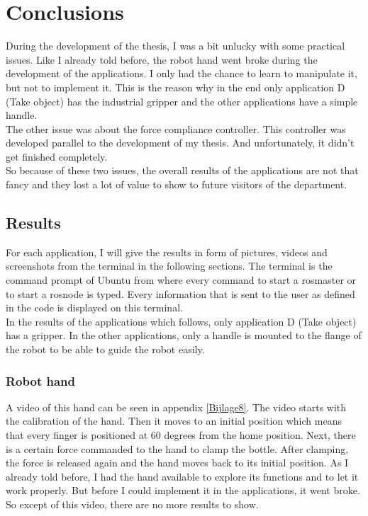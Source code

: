 \documentclass[11pt,a4paper]{report}
\begin{document}
\chapter{Conclusions}
During the development of the thesis, I was a bit unlucky with some practical issues. Like I already told before, the robot hand went broke during the development of the applications. I only had the chance to learn to manipulate it, but not to implement it. This is the reason why in the end only application D (Take object) has the industrial gripper and the other applications have a simple handle.\\
The other issue was about the force compliance controller. This controller was developed parallel to the development of my thesis. And unfortunately, it didn't get finished completely. \\
So because of these two issues, the overall results of the applications are not that fancy and they lost a lot of value to show to future visitors of the department.
\section{Results}
For each application, I will give the results in form of pictures, videos and screenshots from the terminal in the following sections. The terminal is the command prompt of Ubuntu from where every command to start a rosmaster or to start a rosnode is typed. Every information that is sent to the user as defined in the code is displayed on this terminal.\\
In the results of the applications which follows, only application D (Take object) has a gripper. In the other applications, only a handle is mounted to the flange of the robot to be able to guide the robot easily.
\newpage
\subsection{Robot hand}
A video of this hand can be seen in appendix \ref{Bijlage8}. The video starts with the calibration of the hand. Then it moves to an initial position which means that every finger is positioned at 60 degrees from the home position. Next, there is a certain force commanded to the hand to clamp the bottle. After clamping, the force is released again and the hand moves back to its initial position. As I already told before, I had the hand available to explore its functions and to let it work properly. But before I could implement it in the applications, it went broke. So except of this video, there are no more results to show.
\end{document}
